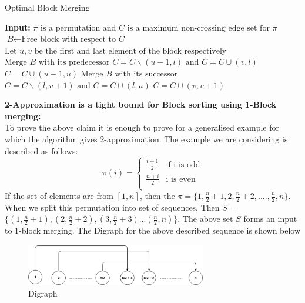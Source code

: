\documentclass[BTech]{iitmdiss}
\begin{document}
\begin{algorithm}
\caption{Optimal Block Merging}\label{euclid}
\begin{algorithmic}[1]
\State \textbf{Input: } $\pi \text{ is a permutation and }\textit{C} \text{ is a maximum non-crossing edge set for } \pi$ 
\State $\textit{B} \gets \text{Free block with respect to }\textit{C}$ 
\State $\text{Let } u,v \text{ be the first and last element of the block respectively}$
\State $\text{Merge } \textit{B} \text{ with its predecessor}$
\State $C = C\backslash(u-1,l)\text{ and } C = C\cup(v,l)$
\EndIf
\State $C = C\cup(u-1,u)$
\Else
\State $\text{Merge } \textit{B} \text{ with its successor}$
\State $C = C\backslash(l,v+1)\text{ and } C = C\cup(l,u)$
\EndIf
\State $C = C\cup(v,v+1)$
\EndIf
\EndWhile
\EndProcedure
\end{algorithmic}
\end{algorithm}
\noindent
\textbf{2-Approximation is a tight bound for Block sorting using 1-Block merging:}\\
To prove the above claim it is enough to prove for a generalised example for which the algorithm gives 2-approximation. The example we are considering is described as follows:
\[ \pi(i) = \begin{cases} 
      \frac{i+1}{2} & \text{if i is odd} \\
      \frac{n+i}{2} & \text{i is even} \\
   \end{cases}
\]
If the set of elements are from $[1,n]$, then the $\pi = \{1,\frac{n}{2}+1,2,\frac{n}{2}+2,....,\frac{n}{2},n\} $. When we split this permutation into set of sequences, Then $S$ = $\{(1,\frac{n}{2}+1),(2,\frac{n}{2}+2),(3,\frac{n}{2}+3)... (\frac{n}{2},n)\}$. The above set $S$ forms an input to 1-block merging. The Digraph for the above described sequence is shown below
\begin{figure}[htpb]
  \begin{center}
    \includegraphics[width=0.7\textwidth]{2approxtight.eps}
    \caption {Digraph}
  \end{center}
\end{figure}
\end{document}
